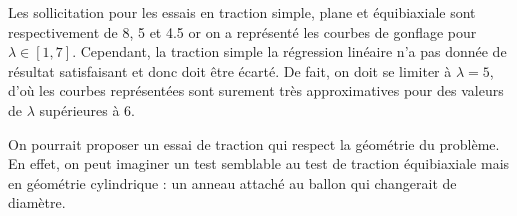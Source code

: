 \documentclass[a4paper,11pt]{article}
\begin{document}
Les sollicitation pour les essais en traction simple, plane et équibiaxiale sont respectivement de 8, 5 et 4.5 or on a représenté les courbes de gonflage pour $\lambda \in [1, 7]$. Cependant, la traction simple la régression linéaire n'a pas donnée de résultat satisfaisant et donc doit être écarté. De fait, on doit se limiter à $\lambda = 5$, d'où les courbes représentées sont surement très approximatives pour des valeurs de $\lambda$ supérieures à 6.

On pourrait proposer un essai de traction qui respect la géométrie du problème. En effet, on peut imaginer un test semblable au test de traction équibiaxiale mais en géométrie cylindrique : un anneau attaché au ballon qui changerait de diamètre.




\end{document}
